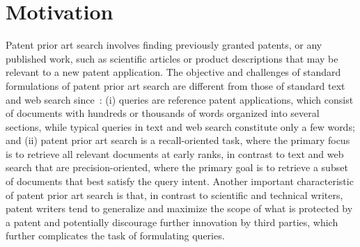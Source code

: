 \section{Motivation}
\label{sec:Motivation}
Patent prior art search involves finding previously granted patents,
or any published work, such as scientific articles or product
descriptions that may be relevant to a new patent application. The
objective and challenges of standard formulations of patent prior art
search are different from those of standard text and web search
since~\cite{magdy2012toward}: (i) queries are reference patent
applications, which consist of documents with hundreds or thousands of
words organized into several sections, while typical queries in text
and web search constitute only a few words; and (ii) patent prior art
search is a recall-oriented task, where the primary focus is to
retrieve all relevant documents at early ranks, in contrast to text
and web search that are precision-oriented, where the primary goal is
to retrieve a subset of documents that best satisfy the query
intent. Another important characteristic of patent prior art search is
that, in contrast to scientific and technical writers, patent writers
tend to generalize and maximize the scope of what is protected by a
patent and potentially discourage further innovation by third parties,
which further complicates the task of formulating queries.

